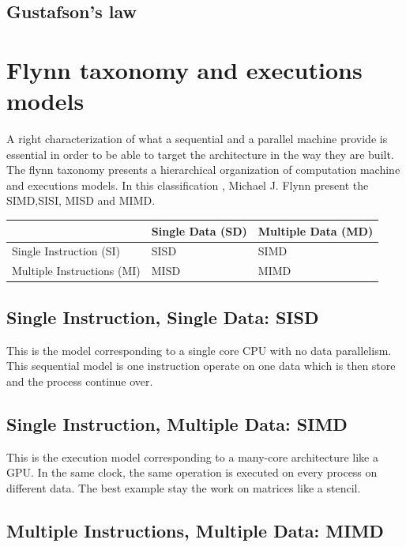 \subsection{Gustafson's law}

\section{Flynn taxonomy and executions models}

A right characterization of what a sequential and a parallel machine provide is essential in order to be able to target the architecture in the way they are built.
The flynn taxonomy presents a hierarchical organization of computation machine and executions models.
In this classification \cite{flynn1972some}, Michael J. Flynn present the SIMD,SISI, MISD and MIMD.

\begin{center}
\begin{tabular}{| l | l | l |}
						& Single Data (SD) 	& Multiple Data (MD) \\
\hline
Single Instruction (SI)		&  SISD			& SIMD \\
\hline
Multiple Instructions (MI) 	& 	MISD		& MIMD \\
\hline
\end{tabular}
\end{center}

\subsection{Single Instruction, Single Data: SISD}
This is the model corresponding to a single core CPU with no data parallelism. 
This sequential model is one instruction operate on one data which is then store and the process continue over. 

\subsection{Single Instruction, Multiple Data: SIMD}
This is the execution model corresponding to a many-core architecture like a GPU. 
In the same clock, the same operation is executed on every process on different data. 
The best example stay the work on matrices like a stencil. 

\subsection{Multiple Instructions, Multiple Data: MIMD}

